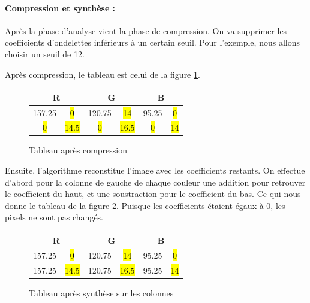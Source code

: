 \documentclass{article}
\begin{document}
\paragraph{Compression et synthèse :}

Après la phase d'analyse vient la phase de compression. On va supprimer les coefficients d'ondelettes inférieurs à un certain seuil. Pour l'exemple, nous allons choisir un seuil de 12.

Après compression, le tableau est celui de la figure \ref{tab4}.

\begin{figure}[!h]
\begin{center}
\begin{tabular}{|c|c|c|c|c|c|}
\hline
\multicolumn{2}{|c|}{R} & \multicolumn{2}{|c|}{G}  & \multicolumn{2}{|c|}{B} \\
\hline
157.25    & \hl{0}   &   120.75  & \hl{14} &   95.25  & \hl{0}   \\ 
\hline
\hl{0}    & \hl{14.5}   &   \hl{0}  & \hl{16.5} &   \hl{0}  & \hl{14} \\
\hline
\end{tabular}
\end{center}
\caption{Tableau après compression}
\label{tab4}
\end{figure}

Ensuite, l'algorithme reconstitue l'image avec les coefficients restants. On effectue d'abord pour la colonne de gauche de chaque couleur une addition pour retrouver le coefficient du haut, et une soustraction pour le coefficient du bas. Ce qui nous donne le tableau de la figure \ref{tab5}. Puisque les coefficients étaient égaux à 0, les pixels ne sont pas changés.

\begin{figure}[!h]
\begin{center}
\begin{tabular}{|c|c|c|c|c|c|}
\hline
\multicolumn{2}{|c|}{R} & \multicolumn{2}{|c|}{G}  & \multicolumn{2}{|c|}{B} \\
\hline
157.25    & \hl{0}   &   120.75  & \hl{14} &   95.25  & \hl{0}   \\ 
\hline
157.25    & \hl{14.5}   &   120.75  & \hl{16.5} &   95.25  & \hl{14} \\
\hline
\end{tabular}
\end{center}
\caption{Tableau après synthèse sur les colonnes}
\label{tab5}
\end{figure}
\end{document}
